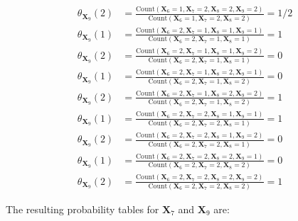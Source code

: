\documentclass[11pt,fancychapters]{article}
\begin{document}
\begin{align*}
	\theta_{\mathbf{X}_9}(2) &= \frac{\text{Count}(\mathbf{X}_6 = 1, \mathbf{X}_7 = 2, \mathbf{X}_8 = 2, \mathbf{X}_9 = 2)}{\text{Count}(\mathbf{X}_6 = 1, \mathbf{X}_7 = 2, \mathbf{X}_8 = 2)} = 1/2 \\
	\theta_{\mathbf{X}_9}(1) &= \frac{\text{Count}(\mathbf{X}_6 = 2, \mathbf{X}_7 = 1, \mathbf{X}_8 = 1, \mathbf{X}_9 = 1)}{\text{Count}(\mathbf{X}_6 = 2, \mathbf{X}_7 = 1, \mathbf{X}_8 = 1)} = 1 \\
	\theta_{\mathbf{X}_9}(2) &= \frac{\text{Count}(\mathbf{X}_6 = 2, \mathbf{X}_7 = 1, \mathbf{X}_8 = 1, \mathbf{X}_9 = 2)}{\text{Count}(\mathbf{X}_6 = 2, \mathbf{X}_7 = 1, \mathbf{X}_8 = 1)} = 0 \\
	\theta_{\mathbf{X}_9}(1) &= \frac{\text{Count}(\mathbf{X}_6 = 2, \mathbf{X}_7 = 1, \mathbf{X}_8 = 2, \mathbf{X}_9 = 1)}{\text{Count}(\mathbf{X}_6 = 2, \mathbf{X}_7 = 1, \mathbf{X}_8 = 2)} = 0 \\
	\theta_{\mathbf{X}_9}(2) &= \frac{\text{Count}(\mathbf{X}_6 = 2, \mathbf{X}_7 = 1, \mathbf{X}_8 = 2, \mathbf{X}_9 = 2)}{\text{Count}(\mathbf{X}_6 = 2, \mathbf{X}_7 = 1, \mathbf{X}_8 = 2)} = 1 \\
	\theta_{\mathbf{X}_9}(1) &= \frac{\text{Count}(\mathbf{X}_6 = 2, \mathbf{X}_7 = 2, \mathbf{X}_8 = 1, \mathbf{X}_9 = 1)}{\text{Count}(\mathbf{X}_6 = 2, \mathbf{X}_7 = 2, \mathbf{X}_8 = 1)} = 1 \\
	\theta_{\mathbf{X}_9}(2) &= \frac{\text{Count}(\mathbf{X}_6 = 2, \mathbf{X}_7 = 2, \mathbf{X}_8 = 1, \mathbf{X}_9 = 2)}{\text{Count}(\mathbf{X}_6 = 2, \mathbf{X}_7 = 2, \mathbf{X}_8 = 1)} = 0 \\
	\theta_{\mathbf{X}_9}(1) &= \frac{\text{Count}(\mathbf{X}_6 = 2, \mathbf{X}_7 = 2, \mathbf{X}_8 = 2, \mathbf{X}_9 = 1)}{\text{Count}(\mathbf{X}_6 = 2, \mathbf{X}_7 = 2, \mathbf{X}_8 = 2)} = 0 \\
	\theta_{\mathbf{X}_9}(2) &= \frac{\text{Count}(\mathbf{X}_6 = 2, \mathbf{X}_7 = 2, \mathbf{X}_8 = 2, \mathbf{X}_9 = 2)}{\text{Count}(\mathbf{X}_6 = 2, \mathbf{X}_7 = 2, \mathbf{X}_8 = 2)} = 1
\end{align*}

The resulting probability tables for $\mathbf{X}_7$ and $\mathbf{X}_9$ are:
\end{document}
